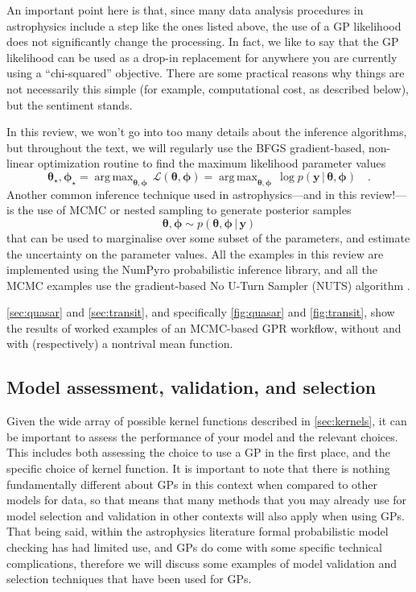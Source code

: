 \documentclass[letterpaper]{ar-1col}
\newcommand{\ydata}{\ensuremath{\boldsymbol{y}}}
\newcommand{\hyperparams}{\ensuremath{\boldsymbol{\phi}}}
\newcommand{\meanparams}{\ensuremath{\boldsymbol{\theta}}}
\DeclareMathOperator*{\argmax}{arg\,max}
\begin{document}
An important point here is that, since many data analysis procedures in astrophysics include a step like the ones listed above, the use of a GP likelihood does not significantly change the processing.
In fact, we like to say that the GP likelihood can be used as a drop-in replacement for anywhere you are currently using a ``chi-squared'' objective.
There are some practical reasons why things are not necessarily this simple (for example, computational cost, as described below), but the sentiment stands.

In this review, we won't go into too many details about the inference algorithms, but throughout the text, we will regularly use the \textsf{BFGS} gradient-based, non-linear optimization routine \citep{Nocedal:1999, scipy} to find the maximum likelihood parameter values
\begin{equation}
  \meanparams_\star,\hyperparams_\star = \argmax_{\meanparams,\hyperparams} \,\mathcal{L}(\meanparams,\hyperparams) = \argmax_{\meanparams,\hyperparams} \,\log p(\ydata\,|\,\meanparams,\hyperparams) \quad.
\end{equation}
Another common inference technique used in astrophysics---and in this review!---is the use of MCMC or nested sampling \citep{skilling2006nested} to generate posterior samples
\begin{equation}
  \meanparams,\hyperparams \sim p(\meanparams,\hyperparams\,|\,\ydata)
\end{equation}
that can be used to marginalise over some subset of the parameters, and estimate the uncertainty on the parameter values.
All the examples in this review are implemented using the \textsf{NumPyro} probabilistic inference library, and all the MCMC examples use the gradient-based No U-Turn Sampler (NUTS) algorithm \citep{Hoffman:2014}.

\autoref{sec:quasar} and \autoref{sec:transit}, and specifically \autoref{fig:quasar} and \autoref{fig:transit}, show the results of worked examples of an MCMC-based GPR workflow, without and with (respectively) a nontrival mean function.


\subsection{Model assessment, validation, and selection}
\label{sec:model_selection}

Given the wide array of possible kernel functions described in \autoref{sec:kernels}, it can be important to assess the performance of your model and the relevant choices.
This includes both assessing the choice to use a GP in the first place, and the specific choice of kernel function.
It is important to note that there is nothing fundamentally different about GPs in this context when compared to other models for data, so that means that many methods that you may already use for model selection and validation in other contexts will also apply when using GPs.
That being said, within the astrophysics literature formal probabilistic model checking has had limited use, and GPs do come with some specific technical complications, therefore we will discuss some examples of model validation and selection techniques that have been used for GPs.
\end{document}
